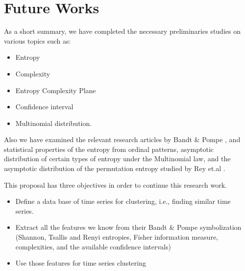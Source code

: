 \chapter{Future Works}\label{C:futw}

As a short summary, we have completed the necessary preliminaries studies on various topics such as:
\begin{itemize}
    \item Entropy
    \item Complexity
    \item Entropy Complexity Plane
    \item Confidence interval
    \item Multinomial distribution.
\end{itemize}

Also we have examined the relevant research articles by Bandt \& Pompe \cite{PhysRevLett.88.174102}, and statistical properties of the entropy from ordinal patterns, asymptotic distribution of certain types of entropy under the Multinomial law, and the asymptotic distribution of the permutation entropy studied by Rey et.al \cite{Rey2025,Rey2023a,Rey2023}.

This proposal has three objectives in order to continue this research work.
\begin{itemize}
	\item Define a data base of time series for clustering, i.e., finding similar time series. 
	\item Extract all the features we know from their Bandt \& Pompe symbolization (Shannon, Tsallis and Renyi entropies, Fisher information measure, complexities, and the available confidence intervals)
	\item Use those features for time series clustering 
\end{itemize} 

